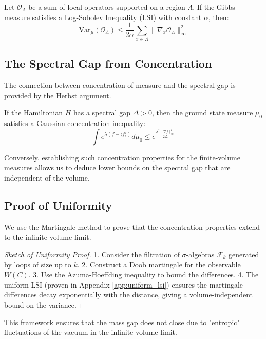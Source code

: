 \begin{theorem}
Let $\mathcal{O}_\Lambda$ be a sum of local operators supported on a region $\Lambda$. If the Gibbs measure satisfies a Log-Sobolev Inequality (LSI) with constant $\alpha$, then:
\begin{equation}
\text{Var}_\mu(\mathcal{O}_\Lambda) \le \frac{1}{2\alpha} \sum_{x \in \Lambda} \|\nabla_x \mathcal{O}_\Lambda\|_\infty^2
\end{equation}
\end{theorem}

\subsection{The Spectral Gap from Concentration}

The connection between concentration of measure and the spectral gap is provided by the Herbst argument.

\begin{theorem}
If the Hamiltonian $H$ has a spectral gap $\Delta > 0$, then the ground state measure $\mu_0$ satisfies a Gaussian concentration inequality:
\begin{equation}
\int e^{\lambda (f - \langle f \rangle)} d\mu_0 \le e^{\frac{\lambda^2 \|\nabla f\|_\infty^2}{2\Delta}}
\end{equation}
\end{theorem}

Conversely, establishing such concentration properties for the finite-volume measures allows us to deduce lower bounds on the spectral gap that are independent of the volume.

\subsection{Proof of Uniformity}

We use the Martingale method to prove that the concentration properties extend to the infinite volume limit.

\begin{proof}[Sketch of Uniformity Proof]
1. Consider the filtration of $\sigma$-algebras $\mathcal{F}_k$ generated by loops of size up to $k$.
2. Construct a Doob martingale for the observable $W(C)$.
3. Use the Azuma-Hoeffding inequality to bound the differences.
4. The uniform LSI (proven in Appendix \ref{app:uniform_lsi}) ensures the martingale differences decay exponentially with the distance, giving a volume-independent bound on the variance.
\end{proof}

This framework ensures that the mass gap does not close due to "entropic" fluctuations of the vacuum in the infinite volume limit.


